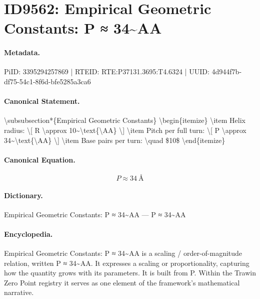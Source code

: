 \section*{ID9562: Empirical Geometric Constants: P ≈ 34\textasciitilde{}AA}
\paragraph{Metadata.}
PiID: 3395294257869 | RTEID: RTE:P37131.3695:T4.6324 | UUID: 4d944f7b-df75-54c1-8f6d-bfe5285a3ca6

\paragraph{Canonical Statement.}
\textbackslash{}subsubsection*\{Empirical Geometric Constants\} \textbackslash{}begin\{itemize\} \textbackslash{}item Helix radius: \textbackslash{}[ R \textbackslash{}approx 10\textasciitilde{}\textbackslash{}text\{\textbackslash{}AA\} \textbackslash{}] \textbackslash{}item Pitch per full turn: \textbackslash{}[ P \textbackslash{}approx 34\textasciitilde{}\textbackslash{}text\{\textbackslash{}AA\} \textbackslash{}] \textbackslash{}item Base pairs per turn: \textbackslash{}quad \$10\$ \textbackslash{}end\{itemize\}

\paragraph{Canonical Equation.}
\[
P \approx 34~\text{\AA}
\]

\paragraph{Dictionary.}
Empirical Geometric Constants: P ≈ 34\textasciitilde{}AA — P ≈ 34\textasciitilde{}AA

\paragraph{Encyclopedia.}
Empirical Geometric Constants: P ≈ 34\textasciitilde{}AA is a scaling / order-of-magnitude relation, written P ≈ 34\textasciitilde{}AA. It expresses a scaling or proportionality, capturing how the quantity grows with its parameters. It is built from P. Within the Trawin Zero Point registry it serves as one element of the framework's mathematical narrative.
